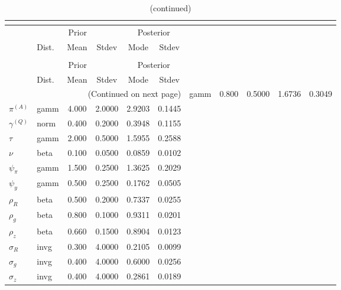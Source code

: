  
\begin{center}
\begin{longtable}{llcccc} 
\caption{Results from posterior maximization (parameters)}\\
 \label{Table:Posterior:1}\\
\toprule 
  & \multicolumn{3}{c}{Prior}  &  \multicolumn{2}{c}{Posterior} \\
  \cmidrule(r{.75em}){2-4} \cmidrule(r{.75em}){5-6}
  & Dist. & Mean  & Stdev & Mode & Stdev \\ 
\midrule \endfirsthead 
\caption{(continued)}\\
 \bottomrule 
  & \multicolumn{3}{c}{Prior}  &  \multicolumn{2}{c}{Posterior} \\
  \cmidrule(r{.75em}){2-4} \cmidrule(r{.75em}){5-6}
  & Dist. & Mean  & Stdev & Mode & Stdev \\ 
\midrule \endhead 
\bottomrule \multicolumn{6}{r}{(Continued on next page)}\endfoot 
\bottomrule\endlastfoot 
${r_{A}}$ & gamm &   0.800 & 0.5000 &   1.6736 &  0.3049 \\ 
${\pi^{(A)}}$ & gamm &   4.000 & 2.0000 &   2.9203 &  0.1445 \\ 
${\gamma^{(Q)}}$ & norm &   0.400 & 0.2000 &   0.3948 &  0.1155 \\ 
${\tau}$ & gamm &   2.000 & 0.5000 &   1.5955 &  0.2588 \\ 
${\nu}$ & beta &   0.100 & 0.0500 &   0.0859 &  0.0102 \\ 
${\psi_\pi}$ & gamm &   1.500 & 0.2500 &   1.3625 &  0.2029 \\ 
${\psi_y}$ & gamm &   0.500 & 0.2500 &   0.1762 &  0.0505 \\ 
${\rho_R}$ & beta &   0.500 & 0.2000 &   0.7337 &  0.0255 \\ 
${\rho_{g}}$ & beta &   0.800 & 0.1000 &   0.9311 &  0.0201 \\ 
${\rho_z}$ & beta &   0.660 & 0.1500 &   0.8904 &  0.0123 \\ 
${\sigma_R}$ & invg &   0.300 & 4.0000 &   0.2105 &  0.0099 \\ 
${\sigma_{g}}$ & invg &   0.400 & 4.0000 &   0.6000 &  0.0256 \\ 
${\sigma_z}$ & invg &   0.400 & 4.0000 &   0.2861 &  0.0189 \\ 
\end{longtable}
 \end{center}

